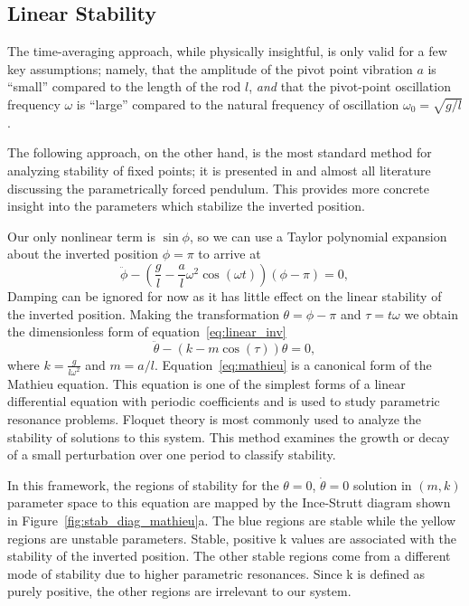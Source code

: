 \documentclass[12pt, letterpaper]{article}
\begin{document}
\subsection{Linear Stability}
The time-averaging approach, while physically insightful, is only valid for a few key assumptions; namely, that the amplitude of the pivot point vibration $a$ is ``small'' compared to the length of the rod $l$, \emph{and} that the pivot-point oscillation frequency $\omega$ is ``large'' compared to the natural frequency of oscillation $\omega_0 = \sqrt{g/l}$. 
\par The following approach, on the other hand, is the most standard method for analyzing stability of fixed points; it is presented in \cite{Butikov2017KapitzaS} \cite{kim1998hu} \cite{kapitsa1951jetp} and almost all literature discussing the parametrically forced pendulum. This provides more concrete insight into the parameters which stabilize the inverted position.

Our only nonlinear term is $\sin{\phi}$, so we can use a Taylor polynomial expansion about the inverted position $\phi = \pi$ to arrive at
\begin{equation}
    \ddot{\phi} - \left(\dfrac{g}{l} - \dfrac{a}{l}\omega^2 \cos(\omega t)\right)(\phi-\pi) = 0            
    \label{eq:linear_inv},
\end{equation}
Damping can be ignored for now as it has little effect on the linear stability of the inverted position. Making the transformation $\theta = \phi-\pi$ and $\tau=t\omega$ we obtain the dimensionless form of equation~\eqref{eq:linear_inv} 
\begin{equation}
    \ddot{\theta} - \left(k - m \cos(\tau)\right)\theta = 0
    \label{eq:mathieu},
\end{equation}
where $k = \frac{g}{l\omega^2}$ and $m =a/l$. Equation~\eqref{eq:mathieu} is a canonical form of the Mathieu equation. This equation is one of the simplest forms of a linear differential equation with periodic coefficients and is used to study parametric resonance problems. Floquet theory is most commonly used to analyze the stability of solutions to this system. This method examines the growth or decay of a small perturbation over one period to classify stability. 

In this framework, the regions of stability for the $\theta=0$, $\dot{\theta}=0$ solution in $(m,k)$ parameter space to this equation are mapped by the Ince-Strutt diagram shown in Figure~\ref{fig:stab_diag_mathieu}a. The blue regions are stable while the yellow regions are unstable parameters. Stable, positive k values are associated with the stability of the inverted position. The other stable regions come from a different mode of stability due to higher parametric resonances. Since k is defined as purely positive, the other regions are irrelevant to our system. 
\end{document}
